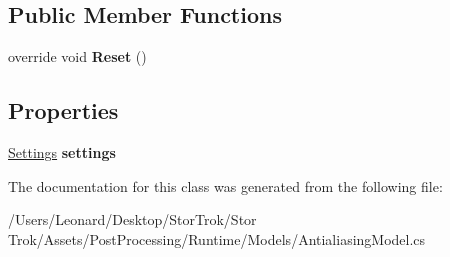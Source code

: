 \subsection*{Public Member Functions}
\begin{DoxyCompactItemize}
\item 
\mbox{\label{class_unity_engine_1_1_post_processing_1_1_antialiasing_model_aeed2830b0c1b3a6ef09c0aea26b0b206}} 
override void {\bfseries Reset} ()
\end{DoxyCompactItemize}
\subsection*{Properties}
\begin{DoxyCompactItemize}
\item 
\mbox{\label{class_unity_engine_1_1_post_processing_1_1_antialiasing_model_af1ad76b667f86a55a3db817f6ebfdbe9}} 
\hyperlink{struct_unity_engine_1_1_post_processing_1_1_antialiasing_model_1_1_settings}{Settings} {\bfseries settings}
\end{DoxyCompactItemize}


The documentation for this class was generated from the following file\+:\begin{DoxyCompactItemize}
\item 
/\+Users/\+Leonard/\+Desktop/\+Stor\+Trok/\+Stor Trok/\+Assets/\+Post\+Processing/\+Runtime/\+Models/Antialiasing\+Model.\+cs\end{DoxyCompactItemize}
